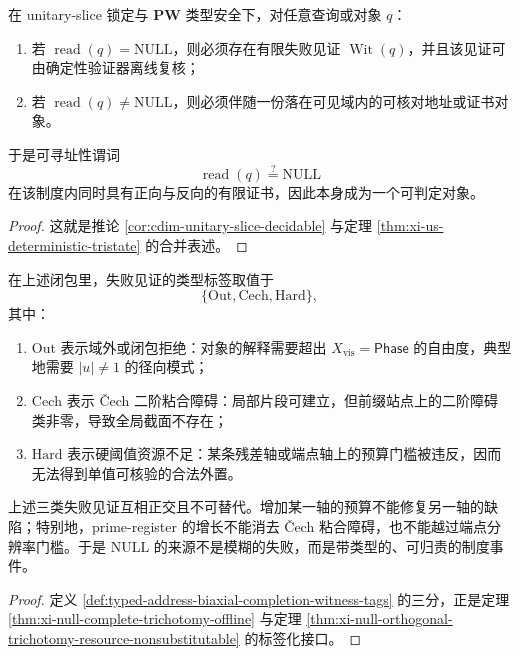 \begin{proposition}[判定性闭合]\label{prop:typed-address-biaxial-completion-decidable-null}
在 unitary-slice 锁定与 \(\mathbf{PW}\) 类型安全下，对任意查询或对象 \(q\)：
\begin{enumerate}
  \item 若 \(\operatorname{read}(q)=\mathrm{NULL}\)，则必须存在有限失败见证 \(\operatorname{Wit}(q)\)，并且该见证可由确定性验证器离线复核；
  \item 若 \(\operatorname{read}(q)\neq \mathrm{NULL}\)，则必须伴随一份落在可见域内的可核对地址或证书对象。
\end{enumerate}
于是可寻址性谓词
\[
\operatorname{read}(q)\stackrel{?}{=}\mathrm{NULL}
\]
在该制度内同时具有正向与反向的有限证书，因此本身成为一个可判定对象。
\end{proposition}
\begin{proof}
这就是推论 \ref{cor:cdim-unitary-slice-decidable} 与定理 \ref{thm:xi-us-deterministic-tristate} 的合并表述。
\end{proof}

\begin{definition}[失败见证的三类标签]\label{def:typed-address-biaxial-completion-witness-tags}
在上述闭包里，失败见证的类型标签取值于
\[
\{\mathrm{Out},\mathrm{Cech},\mathrm{Hard}\},
\]
其中：
\begin{enumerate}
  \item \(\mathrm{Out}\) 表示域外或闭包拒绝：对象的解释需要超出 \(X_{\mathrm{vis}}=\mathsf{Phase}\) 的自由度，典型地需要 \(|u|\neq 1\) 的径向模式；
  \item \(\mathrm{Cech}\) 表示 Čech 二阶粘合障碍：局部片段可建立，但前缀站点上的二阶障碍类非零，导致全局截面不存在；
  \item \(\mathrm{Hard}\) 表示硬阈值资源不足：某条残差轴或端点轴上的预算门槛被违反，因而无法得到单值可核验的合法外置。
\end{enumerate}
\end{definition}

\begin{proposition}[正交三分律]\label{prop:typed-address-biaxial-completion-tag-orthogonality}
上述三类失败见证互相正交且不可替代。增加某一轴的预算不能修复另一轴的缺陷；特别地，prime-register 的增长不能消去 Čech 粘合障碍，也不能越过端点分辨率门槛。于是 \(\mathrm{NULL}\) 的来源不是模糊的失败，而是带类型的、可归责的制度事件。
\end{proposition}
\begin{proof}
定义 \ref{def:typed-address-biaxial-completion-witness-tags} 的三分，正是定理 \ref{thm:xi-null-complete-trichotomy-offline} 与定理 \ref{thm:xi-null-orthogonal-trichotomy-resource-nonsubstitutable} 的标签化接口。
\end{proof}

